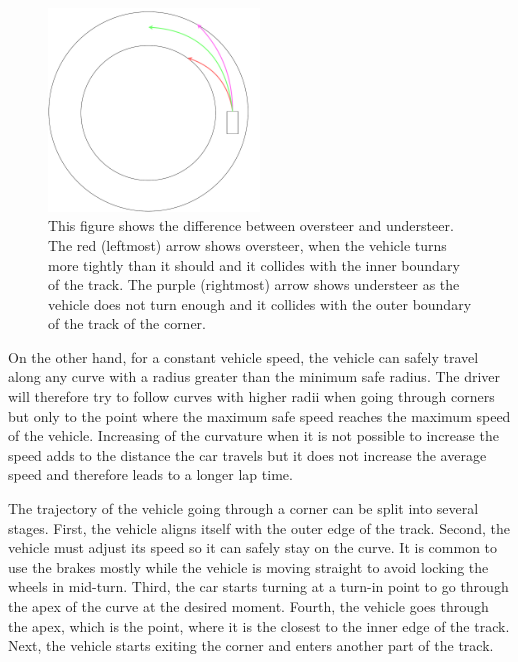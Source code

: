 \begin{figure}[t]
	\centering
	\label{fig:oversteer_understeer}
	\includegraphics[trim=250 180 20 0, clip,width=0.5\textwidth]{../img/understeer_oversteer.pdf}
	\caption{This figure shows the difference between oversteer and understeer. The red (leftmost) arrow shows oversteer, when the vehicle turns more tightly than it should and it collides with the inner boundary of the track. The purple (rightmost) arrow shows understeer as the vehicle does not turn enough and it collides with the outer boundary of the track of the corner.}
\end{figure}

On the other hand, for a constant vehicle speed, the vehicle can safely travel along any curve with a radius greater than the minimum safe radius. The driver will therefore try to follow curves with higher radii when going through corners but only to the point where the maximum safe speed reaches the maximum speed of the vehicle. Increasing of the curvature when it is not possible to increase the speed adds to the distance the car travels but it does not increase the average speed and therefore leads to a longer lap time.

The trajectory of the vehicle going through a corner can be split into several stages. First, the vehicle aligns itself with the outer edge of the track. Second, the vehicle must adjust its speed so it can safely stay on the curve. It is common to use the brakes mostly while the vehicle is moving straight to avoid locking the wheels in mid-turn. Third, the car starts turning at a turn-in point to go through the apex of the curve at the desired moment. Fourth, the vehicle goes through the apex, which is the point, where it is the closest to the inner edge of the track. Next, the vehicle starts exiting the corner and enters another part of the track.


